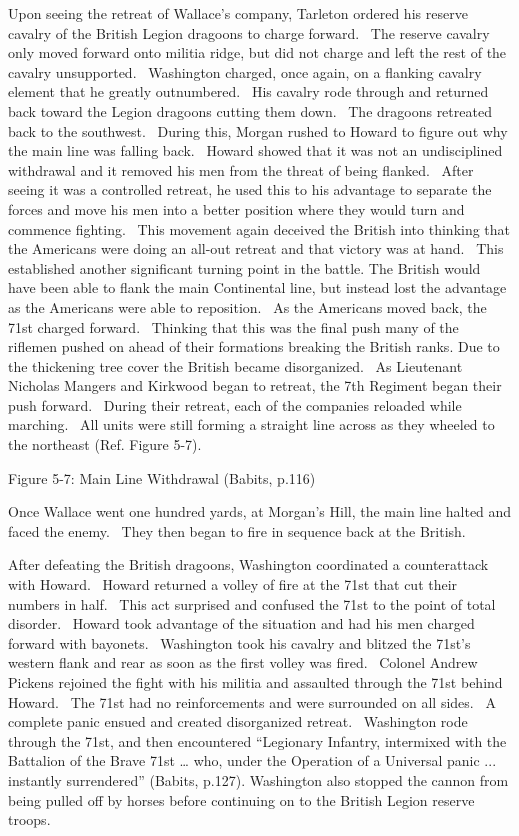 Upon seeing the retreat of Wallace’s company, Tarleton ordered his reserve
cavalry of the British Legion dragoons to charge forward.  The reserve cavalry
only moved forward onto militia ridge, but did not charge and left the rest of
the cavalry unsupported.  Washington charged, once again, on a flanking cavalry
element that he greatly outnumbered.  His cavalry rode through and returned back
toward the Legion dragoons cutting them down.  The dragoons retreated back to
the southwest.  During this, Morgan rushed to Howard to figure out why the main
line was falling back.  Howard showed that it was not an undisciplined
withdrawal and it removed his men from the threat of being flanked.  After
seeing it was a controlled retreat, he used this to his advantage to separate
the forces and move his men into a better position where they would turn and
commence fighting.  This movement again deceived the British into thinking that
the Americans were doing an all-out retreat and that victory was at hand.  This
established another significant turning point in the battle.  The British would
have been able to flank the main Continental line, but instead lost the
advantage as the Americans were able to reposition.  As the Americans moved
back, the 71st charged forward.  Thinking that this was the final push many of
the riflemen pushed on ahead of their formations breaking the British ranks.
Due to the thickening tree cover the British became disorganized.  As Lieutenant
Nicholas Mangers and Kirkwood began to retreat, the 7th Regiment began their
push forward.  During their retreat, each of the companies reloaded while
marching.  All units were still forming a straight line across as they wheeled
to the northeast (Ref. Figure 5-7).



Figure 5-7: Main Line Withdrawal (Babits, p.116)



Once Wallace went one hundred yards, at Morgan’s Hill, the main line halted and
faced the enemy.  They then began to fire in sequence back at the British.  

After defeating the British dragoons, Washington coordinated a counterattack
with Howard.  Howard returned a volley of fire at the 71st that cut their
numbers in half.  This act surprised and confused the 71st to the point of total
disorder.  Howard took advantage of the situation and had his men charged
forward with bayonets.  Washington took his cavalry and blitzed the 71st’s
western flank and rear as soon as the first volley was fired.  Colonel Andrew
Pickens rejoined the fight with his militia and assaulted through the 71st
behind Howard.  The 71st had no reinforcements and were surrounded on all sides.
 A complete panic ensued and created disorganized retreat.  Washington rode
through the 71st, and then encountered “Legionary Infantry, intermixed with the
Battalion of the Brave 71st … who, under the Operation of a Universal panic ...
instantly surrendered” (Babits, p.127).  Washington also stopped the cannon from
being pulled off by horses before continuing on to the British Legion reserve
troops.    

